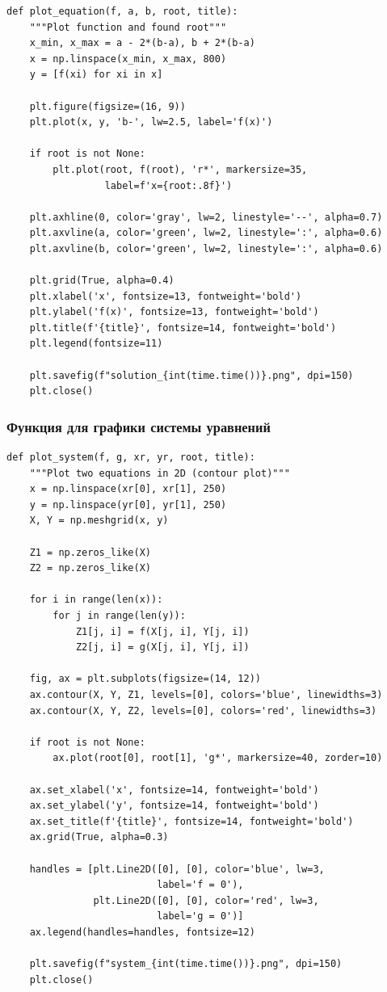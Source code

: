 \documentclass[a4paper,12pt]{article}
\begin{document}
\begin{lstlisting}[style=intellij,caption={plot\_equation()},basicstyle=\ttfamily\small\color{intj-id}]
def plot_equation(f, a, b, root, title):
    """Plot function and found root"""
    x_min, x_max = a - 2*(b-a), b + 2*(b-a)
    x = np.linspace(x_min, x_max, 800)
    y = [f(xi) for xi in x]
    
    plt.figure(figsize=(16, 9))
    plt.plot(x, y, 'b-', lw=2.5, label='f(x)')
    
    if root is not None:
        plt.plot(root, f(root), 'r*', markersize=35,
                 label=f'x={root:.8f}')
    
    plt.axhline(0, color='gray', lw=2, linestyle='--', alpha=0.7)
    plt.axvline(a, color='green', lw=2, linestyle=':', alpha=0.6)
    plt.axvline(b, color='green', lw=2, linestyle=':', alpha=0.6)
    
    plt.grid(True, alpha=0.4)
    plt.xlabel('x', fontsize=13, fontweight='bold')
    plt.ylabel('f(x)', fontsize=13, fontweight='bold')
    plt.title(f'{title}', fontsize=14, fontweight='bold')
    plt.legend(fontsize=11)
    
    plt.savefig(f"solution_{int(time.time())}.png", dpi=150)
    plt.close()
\end{lstlisting}
\newpage
\subsubsection*{Функция для графики системы уравнений}

\begin{lstlisting}[style=intellij,caption={plot\_system()},basicstyle=\ttfamily\small\color{intj-id}]
def plot_system(f, g, xr, yr, root, title):
    """Plot two equations in 2D (contour plot)"""
    x = np.linspace(xr[0], xr[1], 250)
    y = np.linspace(yr[0], yr[1], 250)
    X, Y = np.meshgrid(x, y)
    
    Z1 = np.zeros_like(X)
    Z2 = np.zeros_like(X)
    
    for i in range(len(x)):
        for j in range(len(y)):
            Z1[j, i] = f(X[j, i], Y[j, i])
            Z2[j, i] = g(X[j, i], Y[j, i])
    
    fig, ax = plt.subplots(figsize=(14, 12))
    ax.contour(X, Y, Z1, levels=[0], colors='blue', linewidths=3)
    ax.contour(X, Y, Z2, levels=[0], colors='red', linewidths=3)
    
    if root is not None:
        ax.plot(root[0], root[1], 'g*', markersize=40, zorder=10)
    
    ax.set_xlabel('x', fontsize=14, fontweight='bold')
    ax.set_ylabel('y', fontsize=14, fontweight='bold')
    ax.set_title(f'{title}', fontsize=14, fontweight='bold')
    ax.grid(True, alpha=0.3)
    
    handles = [plt.Line2D([0], [0], color='blue', lw=3,
                          label='f = 0'),
               plt.Line2D([0], [0], color='red', lw=3,
                          label='g = 0')]
    ax.legend(handles=handles, fontsize=12)
    
    plt.savefig(f"system_{int(time.time())}.png", dpi=150)
    plt.close()
\end{lstlisting}
\end{document}
